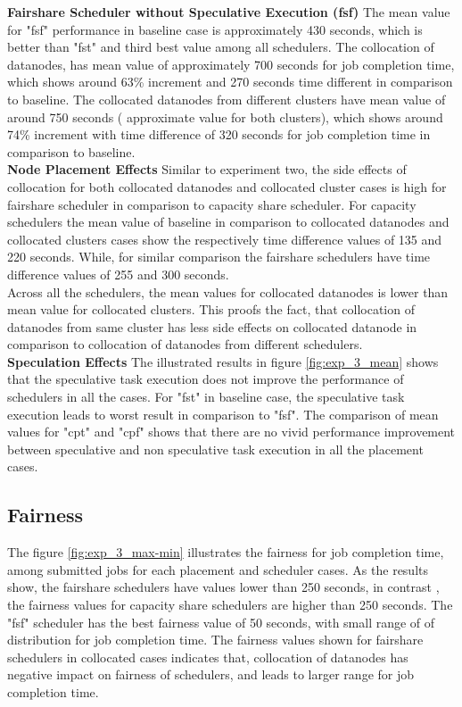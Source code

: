 \textbf{Fairshare Scheduler without Speculative Execution (fsf) } The  mean value for "fsf" performance  in baseline case is approximately 430 seconds, which is better than "fst" and third best value among all schedulers. The collocation of datanodes, has mean value of approximately 700 seconds for job completion time, which shows around 63\% increment and 270 seconds time different in comparison to baseline. The collocated datanodes from different clusters have mean value of around 750 seconds ( approximate value for both clusters), which shows around 74\% increment with time difference of 320 seconds for job completion time in comparison to baseline. \\
 ‌  
\textbf{Node Placement Effects } Similar to experiment two, the side effects of collocation for both collocated datanodes and collocated cluster cases is high for fairshare scheduler in comparison to capacity share scheduler. For capacity schedulers the mean value of baseline in comparison to collocated datanodes and collocated clusters cases show the respectively time difference values of 135 and 220 seconds. While, for similar comparison the fairshare schedulers have time difference values of 255 and 300 seconds. \\    

 Across all the schedulers, the mean values for collocated datanodes is lower than mean value for collocated clusters. This proofs the fact, that collocation of datanodes from same cluster has less side effects on collocated datanode in comparison to collocation of datanodes from different schedulers.\\  



\textbf{Speculation Effects }  The illustrated results in figure \ref{fig:exp_3_mean} shows that the speculative task execution does not improve the performance of schedulers in all the cases. For "fst" in baseline case, the speculative task execution leads to worst result in comparison to "fsf". The comparison of mean values for "cpt" and "cpf" shows that there are no vivid performance improvement between speculative and non speculative task execution in all the placement cases. \\ 

 

\subsection{Fairness}
 The figure \ref{fig:exp_3_max-min} illustrates the fairness for job completion time, among submitted jobs for each placement and scheduler cases. As the results show, the fairshare schedulers have  values  lower than 250 seconds, in contrast , the fairness values for capacity share schedulers are higher than 250 seconds. The "fsf" scheduler has the best fairness value of 50 seconds, with small range of of distribution for job completion time. The fairness values shown for fairshare schedulers in collocated cases indicates that, collocation of datanodes has negative impact on fairness of schedulers, and leads to larger range for job completion time.\\ 
 
